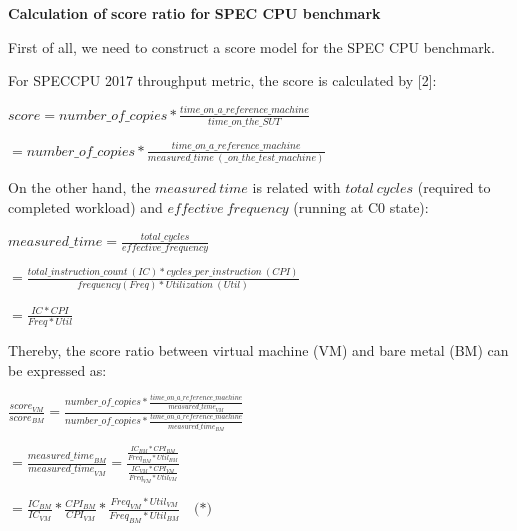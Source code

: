 \documentclass[12pt]{article}
\newcommand{\npar}[1]{#1\par}
\newcommand{\dmath}[1]{{\centering $\displaystyle #1$\par}}
\newcommand{\emptypar}{\mbox{}\par}
\newcommand{\numpara}[4]{{\hangindent=#1\relax\hangafter=1\relax
  \noindent\hspace*{\dimexpr#1-#2\relax}\makebox[#2][l]{#3}#4\par}}
\begin{document}
\emptypar
\numpara{18.00pt}{18.00pt}{\textbf{2.}}{\textbf{Calculation of }\textbf{score ratio for }\textbf{SPEC CPU benchmark}}
\npar{\hspace*{4\fontdimen2\font}First of all, we need to construct a score model for the SPEC CPU benchmark.}
\npar{\hspace*{4\fontdimen2\font}For SPECCPU 2017 throughput metric, the score is calculated by [2]:}
\dmath{\mathit{score}=\mathit{number\_of\_copies}*\frac{\mathit{time\_on\_a\_reference\_machine}}{\mathit{time\_on\_the\_SUT}}}
\dmath{=\mathit{number\_of\_copies}*\frac{\mathit{time\_on\_a\_reference\_machine}}{\mathit{measured\_time}\ (\mathit{\_on\_the\_test\_machine})}}
\emptypar
\npar{\hspace*{4\fontdimen2\font}On the other hand, the $\mathit{measured}\ \mathit{time}$ is related with $\mathit{total}\ \mathit{cycles}$ (required to completed workload) and $\mathit{effective}\ \mathit{frequency}$ (running at C0 state):}
\dmath{\mathit{measured\_time}=\frac{\mathit{total\_cycles}}{\mathit{effective\_frequency}}}
\dmath{=\frac{\mathit{total\_instruction\_count}\ (\mathit{IC})*\mathit{cycles\_per\_instruction}\ (\mathit{CPI})}{\mathit{frequency}\left( \mathit{Freq} \right)*\mathit{Utilization}\ (\mathit{Util})}}
\dmath{=\frac{\mathit{IC}*\mathit{CPI}}{\mathit{Freq}*\mathit{Util}}}
\npar{\hspace*{4\fontdimen2\font}Thereby, the score ratio between virtual machine (VM) and bare metal (BM) can be expressed as:}
\dmath{\frac{\mathit{scor}{\mathit{e}}_{\mathit{VM}}}{\mathit{scor}{\mathit{e}}_{\mathit{BM}}}=\frac{\mathit{number\_of\_copies}*\frac{\mathit{time\_on\_a\_reference\_machine}}{{\mathit{measured\_time}}_{\mathit{VM}}}}{\mathit{number\_of\_copies}*\frac{\mathit{time\_on\_a\_reference\_machine}}{{\mathit{measured\_time}}_{\mathit{BM}}}}}
\dmath{=\frac{{\mathit{measured\_time}}_{\mathit{BM}}}{{\mathit{measured\_time}}_{\mathit{VM}}}=\frac{\frac{\mathit{I}{\mathit{C}}_{\mathit{BM}}*\mathit{CP}{\mathit{I}}_{\mathit{BM}}}{\mathit{Fre}{\mathit{q}}_{\mathit{BM}}*\mathit{Uti}{\mathit{l}}_{\mathit{BM}}}}{\frac{\mathit{I}{\mathit{C}}_{\mathit{VM}}*\mathit{CP}{\mathit{I}}_{\mathit{VM}}}{\mathit{Fre}{\mathit{q}}_{\mathit{VM}}*\mathit{Uti}{\mathit{l}}_{\mathit{VM}}}}}
\dmath{=\frac{{\mathit{IC}}_{\mathit{BM}}}{\mathit{I}{\mathit{C}}_{\mathit{VM}}}*\frac{\mathit{CP}{\mathit{I}}_{\mathit{BM}}}{{\mathit{CPI}}_{\mathit{VM}}}*\frac{\mathit{Fre}{\mathit{q}}_{\mathit{VM}}*\mathit{Uti}{\mathit{l}}_{\mathit{VM}}}{\mathit{Fre}{\mathit{q}}_{\mathit{BM}}*\mathit{Uti}{\mathit{l}}_{\mathit{BM}}}\quad\text{(*)}}
\end{document}
